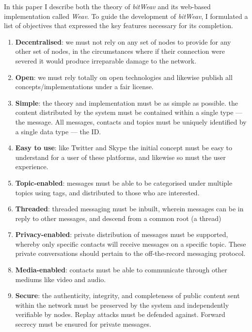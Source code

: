 \documentclass[10pt,a4paper,onecolumn]{article}
\begin{document}
In this paper I describe both the theory of \textit{bitWeav} and its web-based implementation called \textit{Weav}. To guide the development of \textit{bitWeav}, I formulated a list of objectives that expressed the key features necessary for its completion.
\begin{enumerate}
\item \textbf{Decentralised}: we must not rely on any set of nodes to provide for any other set of nodes, in the circumstances where if their connection were severed it would produce irreparable damage to the network. 

\item \textbf{Open}: we must rely totally on open technologies and likewise publish all concepts/implementations under a fair license.

\item \textbf{Simple}: the theory and implementation must be as simple as possible. the content distributed by the system must be contained within a single type — the message. All messages, contacts and topics must be uniquely identified by a single data type — the ID.

\item \textbf{Easy to use}: like Twitter and Skype the initial concept must be easy to understand for a user of these platforms, and likewise so must the user experience.

\item \textbf{Topic-enabled}: messages must be able to be categorised under multiple topics using tags, and distributed to those who are interested.

\item \textbf{Threaded}: threaded messaging must be inbuilt, wherein messages can be in reply to other messages, and descend from a common root (a thread)

\item \textbf{Privacy-enabled}: private distribution of messages must be supported, whereby only specific contacts will receive messages on a specific topic. These private conversations should pertain to the off-the-record messaging protocol. 

\item \textbf{Media-enabled}: contacts must be able to communicate through other mediums like video and audio. 

\item \textbf{Secure}: the authenticity, integrity, and completeness of public content sent within the network must be preserved by the system and independently verifiable by nodes. Replay attacks must be defended against. Forward secrecy must be ensured for private messages.
\end{enumerate}
\end{document}
